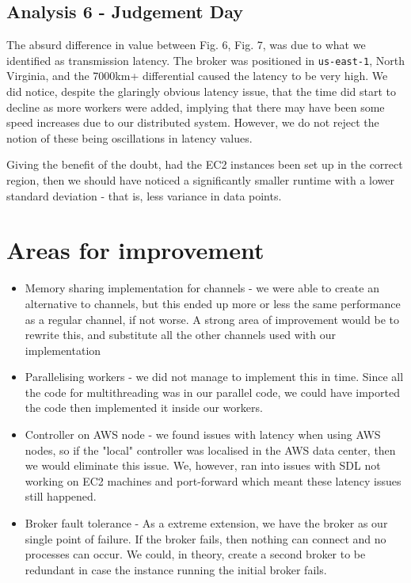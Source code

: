 \documentclass[twoside,twocolumn]{article}
\begin{document}
\subsection{Analysis 6 - Judgement Day}
The absurd difference in value between Fig. 6, Fig. 7, was due to what we identified as transmission latency. The broker
was positioned in \texttt{us-east-1}, North Virginia, and the 7000km+ differential caused the latency 
to be very high.
We did notice, despite the glaringly obvious latency issue, that the time did start to decline as more workers
were added, implying that there may have been some speed increases due to our distributed system. However,
we do not reject the notion of these being oscillations in latency values.

Giving the benefit of the doubt, had the EC2 instances been set up in the correct region, then we should have noticed
a significantly smaller runtime with a lower standard deviation - that is, less variance in data points.



\section{Areas for improvement}

\begin{itemize}
  \item Memory sharing implementation for channels - we were able to create an alternative to channels, but
  this ended up more or less the same performance as a regular channel, if not worse. A strong area of improvement
  would be to rewrite this, and substitute all the other channels used with our implementation
  \item Parallelising workers - we did not manage to implement this in time. Since all the code for multithreading
  was in our parallel code, we could have imported the code then implemented it inside our workers.
  \item Controller on AWS node - we found issues with latency when using AWS nodes, so if the "local" controller was
  localised in the AWS data center, then we would eliminate this issue. We, however, ran into issues with SDL not working
  on EC2 machines and port-forward which meant these latency issues still happened.
  \item Broker fault tolerance - As a extreme extension, we have the broker as our single point of failure. If the broker fails, then
  nothing can connect and no processes can occur. We could, in theory, create a second broker to be redundant in case the instance 
  running the initial broker fails.
\end{itemize}
\end{document}
